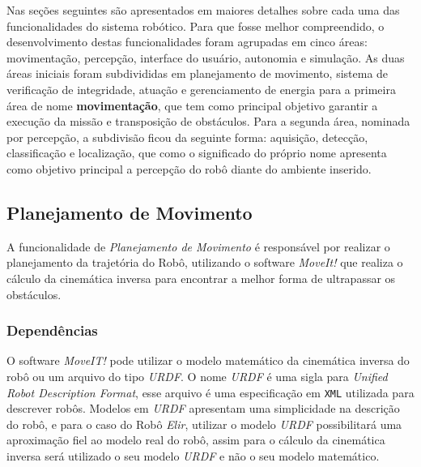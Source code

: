 Nas seções seguintes são apresentados em maiores detalhes sobre cada uma das funcionalidades do sistema robótico. Para que fosse melhor compreendido, o desenvolvimento destas funcionalidades foram agrupadas em cinco áreas: movimentação, percepção, interface do usuário, autonomia e simulação. As duas áreas iniciais foram subdivididas em planejamento de movimento, sistema de verificação de integridade, atuação e gerenciamento de energia para a primeira área de nome \textbf{movimentação}, que tem como principal objetivo garantir a execução da missão e transposição de obstáculos. Para a segunda área, nominada por percepção, a subdivisão ficou da seguinte forma: aquisição, detecção, classificação e localização, que como o significado do próprio nome apresenta como objetivo principal a percepção do robô diante do ambiente inserido.




\subsection{Planejamento de Movimento}
\label{ssec:motion}
A funcionalidade de \textit{Planejamento de Movimento} é responsável por realizar o planejamento da trajetória do Robô, utilizando o software \textit{MoveIt!} que realiza o cálculo da cinemática inversa para encontrar a melhor forma de ultrapassar os obstáculos.
\subsubsection{Dependências}
O software \textit{MoveIT!} pode utilizar o modelo matemático da cinemática inversa do robô ou um arquivo do tipo \textit{URDF}.
O nome \textit{URDF} é uma sigla para \textit{Unified Robot Description Format}, esse arquivo é uma especificação em \verb|XML| utilizada para descrever robôs. Modelos em \textit{URDF} apresentam uma simplicidade na descrição do robô, e para o caso do Robô \textit{Elir}, utilizar o modelo \textit{URDF} possibilitará uma aproximação fiel ao modelo real do robô, assim para o cálculo da cinemática inversa será utilizado o seu modelo \textit{URDF} e não o seu modelo matemático.

